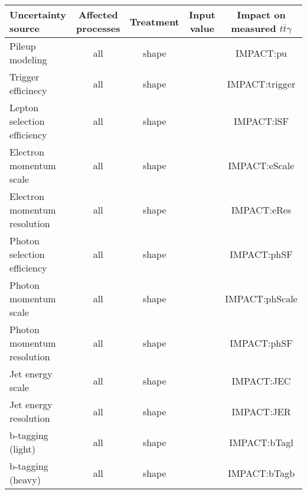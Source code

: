 \begin{table}
  \tiny
  \begin{tabular}{l|c|c|c|c}
    Uncertainty source                      & Affected processes                   & Treatment                     & Input value    & Impact on measured $t\bar{t}\gamma$        \\
    \hline
    Pileup modeling                         & all                                  & shape                         &                & IMPACT:pu       \\
    Trigger efficinecy                      & all                                  & shape                         &                & IMPACT:trigger       \\
    Lepton selection efficiency             & all                                  & shape                         &                & IMPACT:lSF       \\
    Electron momentum scale                 & all                                  & shape                         &                & IMPACT:eScale       \\
    Electron momentum resolution            & all                                  & shape                         &                & IMPACT:eRes       \\
    Photon selection efficiency             & all                                  & shape                         &                & IMPACT:phSF       \\
    Photon momentum scale                   & all                                  & shape                         &                & IMPACT:phScale       \\
    Photon momentum resolution              & all                                  & shape                         &                & IMPACT:phSF       \\
    Jet energy scale                        & all                                  & shape                         &                & IMPACT:JEC       \\
    Jet energy resolution                   & all                                  & shape                         &                & IMPACT:JER       \\
    b-tagging (light)                       & all                                  & shape                         &                & IMPACT:bTagl       \\
    b-tagging (heavy)                       & all                                  & shape                         &                & IMPACT:bTagb       \\

\end{tabular}
\end{table}
